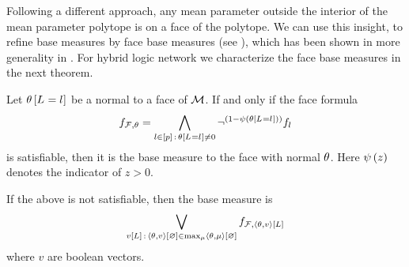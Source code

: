 Following a different approach, any mean parameter outside the interior of the mean parameter polytope is on a face of the polytope.
We can use this insight, to refine base measures by face base measures (see ), which has been shown in more generality in .
For hybrid logic network we characterize the face base measures in the next theorem. 


\begin{theorem}\label{the:hlnFaceBaseMeasureCharacterization}
	Let $\theta\left[L_{}=l_{}\right]$ be a normal to a face of $\mathcal{M}$.
	If and only if the face formula
		\[ f_{\mathcal{F},\theta} = \bigwedge_{l\in[p] \, : \, \theta\left[L_{}=l_{}\right]\neq0} \lnot^{(1-\psi\left(\theta\left[L_{}=l_{}\right]\right))} f_{l}  \]
	is satisfiable, then it is the base measure to the face with normal $\theta$.
	Here $\psi\left(z\right)$ denotes the indicator of $z>0$.
	
	If the above is not satisfiable, then the base measure is
		\[ \bigvee_{v[L] \, : \, \left\langle \theta,v\right\rangle \left[ \varnothing \right] \in \max_{\mu} \left\langle \theta,\mu\right\rangle \left[ \varnothing \right] }  f_{\mathcal{F},\left\langle \theta,v\right\rangle \left[ L \right]}  \]
	where $v$ are boolean vectors.
\end{theorem}
